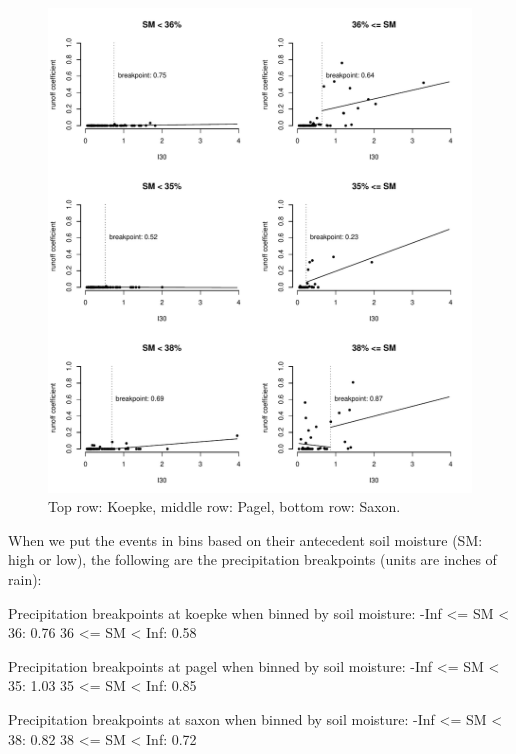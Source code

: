 \documentclass[12pt]{article}
\begin{document}
\begin{figure}
    \begin{center}
\includegraphics{runoff-I30_binned2}
    \end{center}
    \caption{Top row: Koepke, middle row: Pagel, bottom row: Saxon.\label{I30_binned2}}
\end{figure}


When we put the events in bins based on their antecedent soil moisture (SM: high or low), the following are the precipitation breakpoints (units are inches of rain):\\

\begin{Schunk}
\begin{Soutput}
Precipitation breakpoints at koepke when binned by soil moisture:
-Inf <= SM < 36: 0.76
36 <= SM < Inf: 0.58

Precipitation breakpoints at pagel when binned by soil moisture:
-Inf <= SM < 35: 1.03
35 <= SM < Inf: 0.85

Precipitation breakpoints at saxon when binned by soil moisture:
-Inf <= SM < 38: 0.82
38 <= SM < Inf: 0.72
\end{Soutput}
\end{Schunk}
\end{document}
